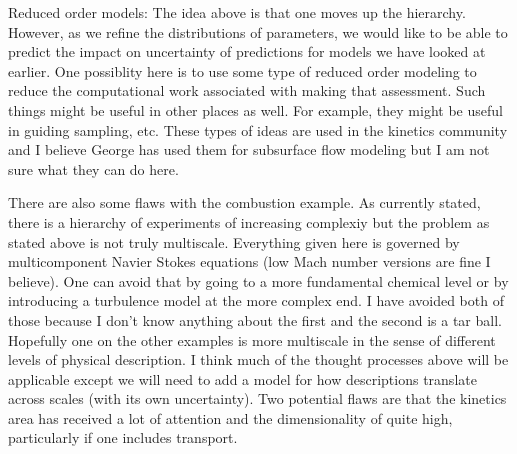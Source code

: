 \documentclass[11pt]{article}
\begin{document}
Reduced order models:  The idea above is that one moves up the hierarchy.  However, as we refine the distributions
of parameters, we would like to be able to predict the impact on uncertainty of predictions for models we have looked
at earlier.  One possiblity here is to use some type of reduced order modeling to reduce the computational work
associated with making that assessment. Such things might be useful in other places as well. For example, they might
be useful in guiding sampling, etc.  These types of ideas are used in the kinetics community and I believe George
has used them for subsurface flow modeling but I am not sure what they can do here.  

There are also some flaws with the combustion example.  As currently stated, there is a hierarchy of experiments
of increasing complexiy but the problem as stated above is not truly multiscale.  Everything given here is governed
by multicomponent Navier Stokes equations (low Mach number versions are fine I believe). One can avoid that by
going to a more fundamental chemical level or by introducing a turbulence model at the more complex end.  
I have avoided both of those because I don't know anything about the first and the second is a tar ball.
Hopefully one on the other examples is more multiscale in the sense of different levels of physical description.
I think much of the thought processes above will be applicable except we will need to add a model for how
descriptions translate across scales (with its own uncertainty).
Two potential flaws are that the kinetics area has received a lot of attention
and the dimensionality of quite high, particularly if one includes transport.
\end{document}

